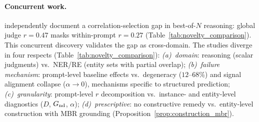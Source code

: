 \paragraph{Concurrent work.}
\citet{landesberg2026bon} independently document a correlation-selection gap in best-of-$N$ reasoning: global judge $r{=}0.47$ masks within-prompt $r{=}0.27$ (Table~\ref{tab:novelty_comparison}).
This concurrent discovery validates the gap as cross-domain.
The studies diverge in four respects (Table~\ref{tab:novelty_comparison}):
\textit{(a)~domain}: reasoning (scalar judgments) vs.\ NER/RE (entity sets with partial overlap);
\textit{(b)~failure mechanism}: prompt-level baseline effects vs.\ degeneracy ($12$--$68$\%) and signal alignment collapse ($\alpha{\to}0$), mechanisms specific to structured prediction;
\textit{(c)~granularity}: prompt-level $r$ decomposition vs.\ instance- and entity-level diagnostics ($D$, $G_{\textup{nd}}$, $\alpha$);
\textit{(d)~prescriptive}: no constructive remedy vs.\ entity-level construction with MBR grounding (Proposition~\ref{prop:construction_mbr}).
